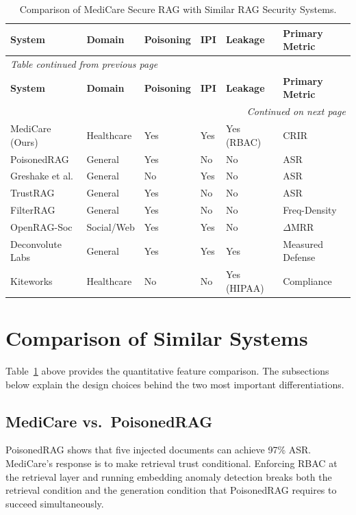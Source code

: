 \renewcommand{\arraystretch}{0.95} %

\begin{center}
\small
\begin{longtable}{|p{2.6cm}|p{1.5cm}|p{1.2cm}|p{1.0cm}|p{1.5cm}|p{2.4cm}|}
\caption{Comparison of MediCare Secure RAG with Similar RAG Security Systems.}
\label{tab:comparison} \\
\hline
\rowcolor{gray!15}
\textbf{System} & \textbf{Domain} & \textbf{Poisoning} & \textbf{IPI} & \textbf{Leakage} & \textbf{Primary Metric} \\
\hline
\endfirsthead
\multicolumn{6}{l}{\small\textit{Table \thetable{} continued from previous page}} \\[2pt]
\hline
\rowcolor{gray!15}
\textbf{System} & \textbf{Domain} & \textbf{Poisoning} & \textbf{IPI} & \textbf{Leakage} & \textbf{Primary Metric} \\
\hline
\endhead
\hline
\multicolumn{6}{r}{\small\textit{Continued on next page}} \\
\endfoot
\hline
\endlastfoot

MediCare (Ours) & Healthcare & Yes & Yes & Yes (RBAC) & CRIR \\
\hline
PoisonedRAG & General & Yes & No & No & ASR \\
\hline
Greshake et al. & General & No & Yes & No & ASR \\
\hline
TrustRAG & General & Yes & No & No & ASR \\
\hline
FilterRAG & General & Yes & No & No & Freq-Density \\
\hline
OpenRAG-Soc & Social/Web & Yes & Yes & No & $\Delta$MRR \\
\hline
Deconvolute Labs & General & Yes & Yes & Yes & Measured Defense \\
\hline
Kiteworks & Healthcare & No & No & Yes (HIPAA) & Compliance \\
\hline

\end{longtable}
\end{center}
\section{Comparison of Similar Systems}

Table~\ref{tab:comparison} above provides the quantitative feature comparison. The subsections below explain the design choices behind the two most important differentiations.

\subsection{MediCare vs.\ PoisonedRAG}
PoisonedRAG shows that five injected documents can achieve 97\% ASR. MediCare's response is to make retrieval trust conditional. Enforcing RBAC at the retrieval layer and running embedding anomaly detection breaks both the retrieval condition and the generation condition that PoisonedRAG requires to succeed simultaneously.

